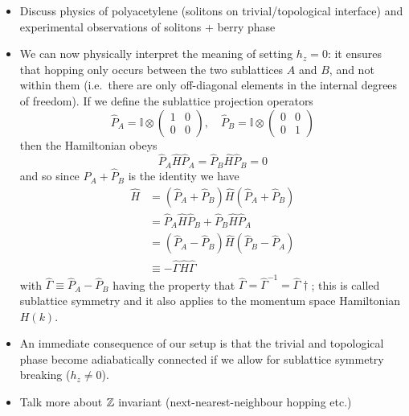 {\color{blue}
\begin{itemize}
	\item Discuss physics of polyacetylene (solitons on trivial/topological interface) and experimental observations of solitons + berry phase \cites{Meier_SSH-soliton}{Atala_SSH-Zak}
	
	\item We can now physically interpret the meaning of setting $h_z = 0$: it ensures that hopping only occurs between the two sublattices $A$ and $B$, and not within them (i.e.\ there are only off-diagonal elements in the internal degrees of freedom). If we define the sublattice projection operators
	\[
		\hat{P}_A = \mathbb{I} \otimes \begin{pmatrix}
			1 & 0 \\ 0 & 0
		\end{pmatrix},\quad \hat{P}_B = \mathbb{I} \otimes \begin{pmatrix}
			0 & 0 \\ 0 & 1
		\end{pmatrix}
	\]
	then the Hamiltonian obeys
	\[
		\hat{P}_A\hat{H}\hat{P}_A = \hat{P}_B\hat{H}\hat{P}_B = 0
	\]
	and so since $\hat{P}_A + \hat{P}_B$ is the identity we have
	\begin{align*}
		\hat{H} &= (\hat{P}_A + \hat{P}_B)\hat{H}(\hat{P}_A + \hat{P}_B) \\
			&= \hat{P}_A\hat{H}\hat{P}_B + \hat{P}_B\hat{H}\hat{P}_A \\
			&= (\hat{P}_A - \hat{P}_B)\hat{H}(\hat{P}_B - \hat{P}_A) \\
			&\equiv -\hat{\Gamma}\hat{H}\hat{\Gamma}
	\end{align*}
	with $\hat{\Gamma}\equiv\hat{P}_A - \hat{P}_B$ having the property that $\hat{\Gamma} = \hat{\Gamma}^{-1} = \hat{\Gamma}\dagger$; this is called sublattice symmetry and it also applies to the momentum space Hamiltonian $H(k)$.
	
	\item An immediate consequence of our setup is that the trivial and topological phase become adiabatically connected if we allow for sublattice symmetry breaking ($h_z \neq 0$).
	
	\item Talk more about $\mathbb{Z}$ invariant (next-nearest-neighbour hopping etc.)
\end{itemize}
}

%
%	
%	

